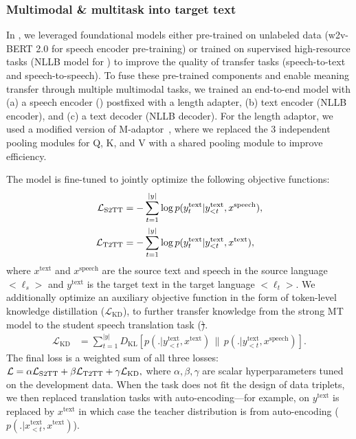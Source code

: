 \subsubsection{Multimodal \& multitask into target text}\label{sec:modeling:x2t:stage12} 
In \mfourt, we leveraged foundational models either pre-trained on unlabeled data (w2v-BERT 2.0 for speech encoder pre-training) or trained on supervised high-resource tasks (NLLB model for \mt) to improve the quality of transfer tasks (speech-to-text and speech-to-speech). To fuse these pre-trained components and enable meaning transfer through multiple multimodal tasks, we trained an end-to-end model with (a) a speech encoder (\wvbert) postfixed with a length adapter, (b) text encoder (NLLB encoder), and (c) a text decoder (NLLB decoder). 
For the length adaptor, we used a modified version of M-adaptor~\citep{zhao22g_interspeech}, where we replaced the 3 independent pooling modules for Q, K, and V with a shared pooling module to improve efficiency.

The model is fine-tuned to jointly optimize the following objective functions:
\begin{align}
    \mathcal L_{\text{{S2TT}}} & = - \sum_{t=1}^{|y|} \log p(y^\text{text}_t | y^\text{text}_{<t}, x^\text{speech}),\\
    \mathcal L_{\text{{T2TT}}} & = - \sum_{t=1}^{|y|} \log p(y^\text{text}_t | y^\text{text}_{<t}, x^\text{text}),
\end{align}
where $x^\text{text}$ and $x^\text{speech}$ are the source text and speech in the source language ${<}\ell_s{>}$ and $y^\text{text}$ is the target text in the target language ${<}\ell_t{>}$.
We additionally optimize an auxiliary objective function in the form of token-level knowledge distillation ($\mathcal{L}_{\text{KD}}$), to further transfer knowledge from the strong MT model 
to the student speech translation task (\st).
\begin{align}
    \mathcal{L}_{\text{KD}} & = \sum_{t=1}^{|y|} D_\text{KL}
    \left[
    p(. |y^\text{text}_{<t}, x^\text{text})\, \| \,
    p(. |y^\text{text}_{<t}, x^\text{speech})
\right].
\end{align}
The final loss is a weighted sum of all three losses:
    $\mathcal L = \alpha \mathcal{L}_{\text{{S2TT}}} + \beta \mathcal{L}_{\text{{T2TT}}}+ \gamma \mathcal{L}_{\text{KD}},$
where $\alpha, \beta, \gamma$ are scalar hyperparameters tuned on the development data.
When the task does not fit the design of data triplets, we
then replaced translation tasks with auto-encoding—for example, on \asr $y^\text{text}$ is replaced by $x^\text{text}$ 
in which case the teacher distribution is from auto-encoding ($p(. |x^\text{text}_{<t}, x^\text{text})$).

